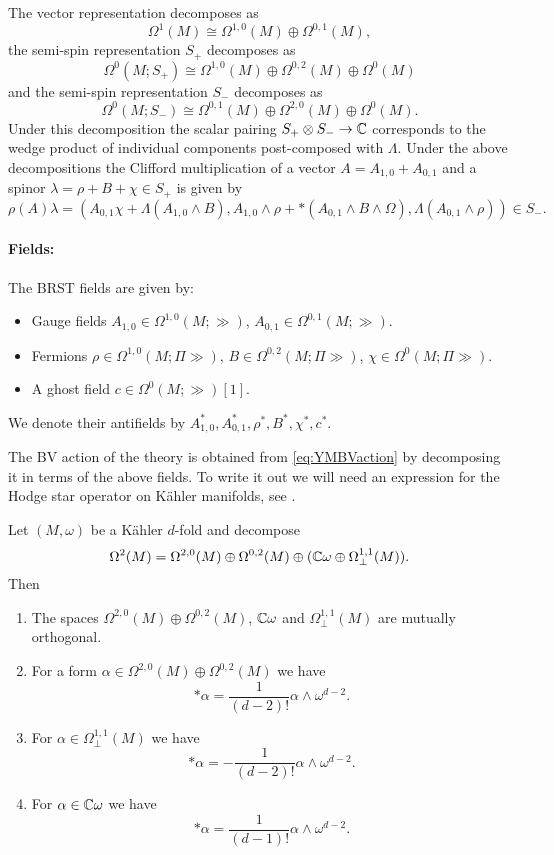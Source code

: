 \documentclass[10pt, oneside]{article}
\begin{document}
The vector representation decomposes as
\[\Omega^1(M)\cong \Omega^{1, 0}(M)\oplus \Omega^{0, 1}(M),\]
the semi-spin representation $S_+$ decomposes as
\[\Omega^0(M; S_+)\cong \Omega^{1, 0}(M)\oplus \Omega^{0, 2}(M)\oplus \Omega^0(M)\]
and the semi-spin representation $S_-$ decomposes as
\[\Omega^0(M; S_-)\cong \Omega^{0, 1}(M)\oplus \Omega^{2, 0}(M)\oplus \Omega^0(M).\]
Under this decomposition the scalar pairing $S_+\otimes S_-\rightarrow \mathbb C$ corresponds to the wedge product of individual components post-composed with $\Lambda$. Under the above decompositions the Clifford multiplication of a vector $A = A_{1, 0} + A_{0, 1}$ and a spinor $\lambda = \rho + B + \chi\in S_+$ is given by
\[\rho(A)\lambda = (A_{0, 1}\chi + \Lambda(A_{1, 0}\wedge B), A_{1, 0}\wedge \rho + \ast(A_{0, 1}\wedge B\wedge\Omega), \Lambda(A_{0, 1}\wedge \rho))\in S_-.\]

\vspace{-10pt}
\paragraph{Fields:} The BRST fields are given by:
\begin{itemize}
\item Gauge fields $A_{1, 0}\in\Omega^{1, 0}(M; \gg)$, $A_{0, 1}\in\Omega^{0, 1}(M; \gg)$.
\item Fermions $\rho\in\Omega^{1, 0}(M; \Pi\gg)$, $B\in\Omega^{0, 2}(M; \Pi\gg)$, $\chi\in\Omega^0(M; \Pi\gg)$.
\item A ghost field $c\in\Omega^0(M; \gg)[1]$.
\end{itemize}
We denote their antifields by $A_{1, 0}^*, A_{0, 1}^*, \rho^*, B^*, \chi^*, c^*$.

The BV action of the theory is obtained from \eqref{eq:YMBVaction} by decomposing it in terms of the above fields. To write it out we will need an expression for the Hodge star operator on K\"{a}hler manifolds, see \cite[Proposition 1.2.31]{Huybrechts}.

\begin{prop}
Let $(M, \omega)$ be a K\"{a}hler $d$-fold and decompose
\[\Omega^2(M) = \Omega^{2, 0}(M)\oplus \Omega^{0, 2}(M)\oplus (\mathbb C\omega\oplus \Omega^{1, 1}_\perp(M)).\]
Then
\begin{enumerate}
\item The spaces $\Omega^{2, 0}(M)\oplus \Omega^{0, 2}(M)$, $\mathbb C\omega$ and $\Omega^{1, 1}_\perp(M)$ are mutually orthogonal.

\item For a form $\alpha\in\Omega^{2, 0}(M)\oplus \Omega^{0, 2}(M)$ we have
\[\ast \alpha = \frac{1}{(d-2)!} \alpha\wedge \omega^{d-2}.\]

\item For $\alpha\in \Omega^{1, 1}_\perp(M)$ we have
\[\ast\alpha = -\frac{1}{(d-2)!} \alpha\wedge \omega^{d-2}.\]

\item For $\alpha\in\mathbb C\omega$ we have
\[\ast \alpha = \frac{1}{(d-1)!} \alpha\wedge \omega^{d-2}.\]
\end{enumerate}
\end{prop}
\end{document}
